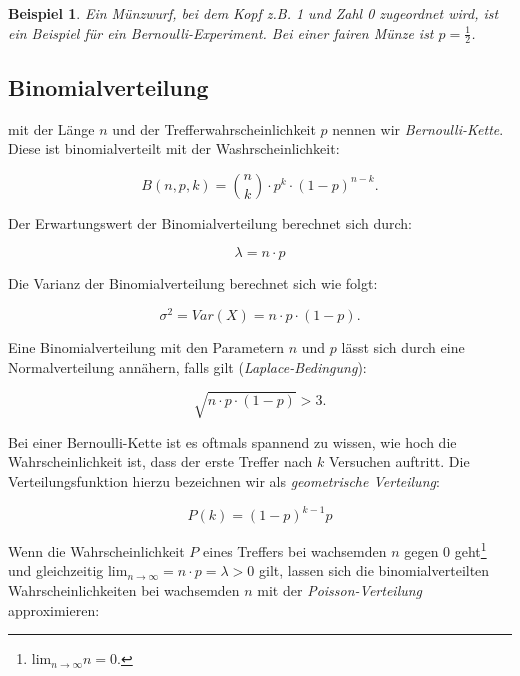 \documentclass{tufte-handout}
\theoremstyle{own}
\newtheorem{example}{Beispiel}[]
\begin{document}
\begin{example}
	Ein Münzwurf, bei dem Kopf z.B. 1 und Zahl 0 zugeordnet wird, ist
	ein Beispiel für ein Bernoulli-Experiment. Bei einer fairen Münze ist 
	$p= \frac{1}{2}$.
\end{example}

\subsection{Binomialverteilung}

 mit der Länge $n$ und der Trefferwahrscheinlichkeit
$p$ nennen wir \textit{Bernoulli-Kette}. Diese ist binomialverteilt mit der 
Washrscheinlichkeit:

\begin{equation}
	B(n,p,k) = \binom{n}{k} \cdot p^k \cdot (1-p)^{n-k}.
\end{equation}

Der Erwartungswert der Binomialverteilung berechnet sich durch:

\begin{equation}
	\lambda = n \cdot p
\end{equation}

Die Varianz der Binomialverteilung berechnet sich wie folgt:

\begin{equation}
	\sigma^2 = Var(X) = n \cdot p \cdot (1-p).
\end{equation}

Eine Binomialverteilung mit den Parametern $n$ und $p$ lässt sich durch eine Normalverteilung annähern,
falls gilt (\textit{Laplace-Bedingung}): 

\begin{equation}
\sqrt{n \cdot p \cdot (1-p)} > 3.
\end{equation}

Bei einer Bernoulli-Kette ist es oftmals spannend zu wissen, wie hoch die
Wahrscheinlichkeit ist, dass der erste Treffer nach $k$ Versuchen auftritt.
Die Verteilungsfunktion hierzu bezeichnen wir als \textit{geometrische Verteilung}:

\begin{equation}
	P(k) = (1 - p)^{k-1} p
\end{equation}

Wenn die Wahrscheinlichkeit $P$ eines Treffers bei wachsemden $n$ gegen 0
geht\footnote{$\text{lim}_{n \rightarrow \infty} n = 0$.} und gleichzeitig
$\text{lim}_{n \rightarrow \infty} = n \cdot p = \lambda > 0$ gilt, lassen
sich die binomialverteilten Wahrscheinlichkeiten bei wachsemden $n$ mit der
\textit{Poisson-Verteilung} approximieren:
\end{document}
